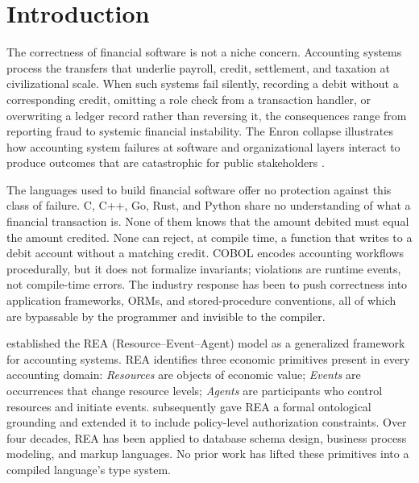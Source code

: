\documentclass[11pt,a4paper]{article}
\theoremstyle{remark}
\begin{document}
\section{Introduction}\label{sec:intro}

The correctness of financial software is not a niche concern. Accounting
systems process the transfers that underlie payroll, credit, settlement,
and taxation at civilizational scale. When such systems fail silently,
recording a debit without a corresponding credit, omitting a role check
from a transaction handler, or overwriting a ledger record rather than
reversing it, the consequences range from reporting fraud to systemic
financial instability. The Enron collapse illustrates how accounting
system failures at software and organizational layers interact to
produce outcomes that are catastrophic for public stakeholders
\citep{coffee_understanding_2002}.

The languages used to build financial software offer no protection
against this class of failure. C, C++, Go, Rust, and Python share no
understanding of what a financial transaction is. None of them knows
that the amount debited must equal the amount credited. None can reject,
at compile time, a function that writes to a debit account without a
matching credit. COBOL encodes accounting workflows procedurally, but it
does not formalize invariants; violations are runtime events, not
compile-time errors. The industry response has been to push correctness
into application frameworks, ORMs, and stored-procedure conventions, all
of which are bypassable by the programmer and invisible to the compiler.

\citet{mccarthy_rea_1982} established the REA (Resource--Event--Agent) model
as a generalized framework for accounting systems. REA identifies three
economic primitives present in every accounting domain: \emph{Resources}
are objects of economic value; \emph{Events} are occurrences that change
resource levels; \emph{Agents} are participants who control resources and
initiate events. \citet{geerts_ontological_2002} subsequently gave REA a
formal ontological grounding and \citet{geerts_policy-level_2006} extended it to
include policy-level authorization constraints. Over four decades, REA has
been applied to database schema design, business process modeling, and
markup languages. No prior work has lifted these primitives into a
compiled language's type system.
\end{document}
